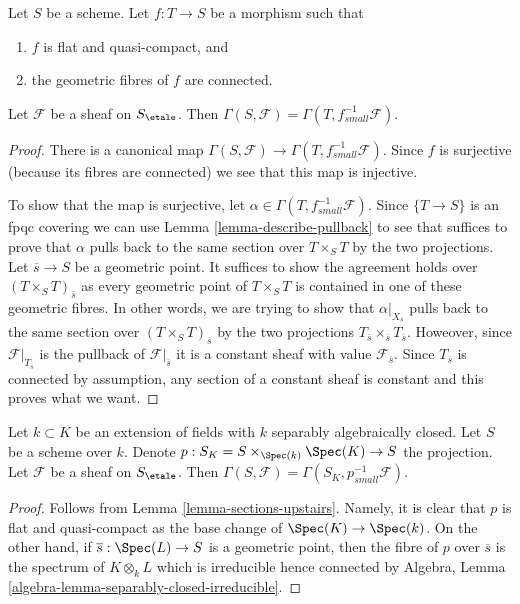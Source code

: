 \begin{lemma}
\label{lemma-sections-upstairs}
Let $S$ be a scheme. Let $f : T \to S$ be a morphism such that
\begin{enumerate}
\item $f$ is flat and quasi-compact, and
\item the geometric fibres of $f$ are connected.
\end{enumerate}
Let $\mathcal{F}$ be a sheaf on $S_\etale$.
Then $\Gamma(S, \mathcal{F}) = \Gamma(T, f^{-1}_{small}\mathcal{F})$.
\end{lemma}

\begin{proof}
There is a canonical map
$\Gamma(S, \mathcal{F}) \to \Gamma(T, f_{small}^{-1}\mathcal{F})$.
Since $f$ is surjective (because its fibres are connected) we see that
this map is injective.

\medskip\noindent
To show that the map is surjective, let
$\alpha \in \Gamma(T, f_{small}^{-1}\mathcal{F})$.
Since $\{T \to S\}$ is an fpqc covering we can use
Lemma \ref{lemma-describe-pullback} to see that suffices to prove that
$\alpha$ pulls back to the same section over $T \times_S T$ by the
two projections. Let $\overline{s} \to S$ be a geometric point.
It suffices to show the agreement holds over $(T \times_S T)_{\overline{s}}$
as every geometric point of $T \times_S T$ is contained in one of
these geometric fibres. In other words, we are trying to show that
$\alpha|_{X_{\overline{s}}}$ pulls back to the same section over
$(T \times_S T)_{\overline{s}}$ by the two projections
$T_{\overline{s}} \times_{\overline{s}} T_{\overline{s}}$.
Howeover, since $\mathcal{F}|_{T_{\overline{s}}}$ is the
pullback of $\mathcal{F}|_{\overline{s}}$ it is a constant sheaf
with value $\mathcal{F}_{\overline{s}}$. Since $T_{\overline{s}}$
is connected by assumption, any section of a constant sheaf is constant
and this proves what we want.
\end{proof}

\begin{lemma}
\label{lemma-sections-base-field-extension}
Let $k \subset K$ be an extension of fields with $k$ separably
algebraically closed. Let $S$ be a scheme over $k$. Denote
$p : S_K = S \times_{\Spec(k)} \Spec(K) \to S$ the projection.
Let $\mathcal{F}$ be a sheaf on $S_\etale$.
Then $\Gamma(S, \mathcal{F}) = \Gamma(S_K, p^{-1}_{small}\mathcal{F})$.
\end{lemma}

\begin{proof}
Follows from Lemma \ref{lemma-sections-upstairs}. Namely, it is clear
that $p$ is flat and quasi-compact as the base change of
$\Spec(K) \to \Spec(k)$. On the other hand, if $\overline{s} : \Spec(L) \to S$
is a geometric point, then the fibre of $p$ over $\overline{s}$
is the spectrum of $K \otimes_k L$ which is irreducible hence connected by
Algebra, Lemma \ref{algebra-lemma-separably-closed-irreducible}.
\end{proof}









